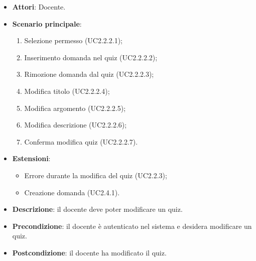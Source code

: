 \begin{itemize}
\item \textbf{Attori}: Docente.
\item \textbf{Scenario principale}:
\begin{enumerate}
\item Selezione permesso (UC2.2.2.1);
\item Inserimento domanda nel quiz (UC2.2.2.2);
\item Rimozione domanda dal quiz (UC2.2.2.3);
\item Modifica titolo (UC2.2.2.4);
\item Modifica argomento (UC2.2.2.5);
\item Modifica descrizione (UC2.2.2.6);
\item Conferma modifica quiz (UC2.2.2.7).
\end{enumerate}
\item \textbf{Estensioni}:
\begin{itemize}
\item Errore durante la modifica del quiz (UC2.2.3);
\item Creazione domanda (UC2.4.1).
\end{itemize}
\item \textbf{Descrizione}: il docente deve poter modificare un quiz.
\item \textbf{Precondizione}: il docente è autenticato nel sistema e desidera modificare un quiz.
\item \textbf{Postcondizione}: il docente ha modificato il quiz.
\end{itemize}
